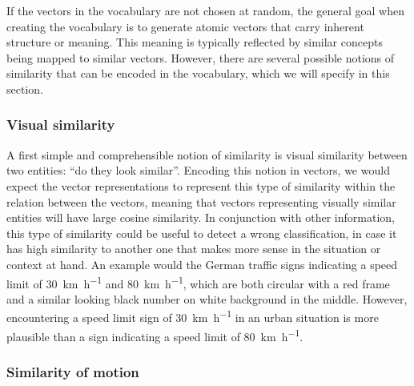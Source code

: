If the vectors in the vocabulary are not chosen at random, the general goal when creating the vocabulary is to generate atomic vectors that carry inherent structure or meaning.
This meaning is typically reflected by similar concepts being mapped to similar vectors.
However, there are several possible notions of similarity that can be encoded in the vocabulary, which we will specify in this section.

\subsubsection{Visual similarity}%
\label{ssubsec:visual_similarity}

A first simple and comprehensible notion of similarity is visual similarity between two entities: \enquote{do they look similar}. 
Encoding this notion in vectors, we would expect the vector representations to represent this type of similarity within the relation between the vectors, meaning that vectors representing visually similar entities will have large cosine similarity.
In conjunction with other information, this type of similarity could be useful to detect a wrong classification, in case it has high similarity to another one that makes more sense in the situation or context at hand.
An example would the German traffic signs indicating a speed limit of \SI[per-mode=symbol]{30}{\kilo\meter\per\hour} and \SI[per-mode=symbol]{80}{\kilo\meter\per\hour}, which are both circular with a red frame and a similar looking black number on white background in the middle.
However, encountering a speed limit sign of \SI[per-mode=symbol]{30}{\kilo\meter\per\hour} in an urban situation is more plausible than a sign indicating a speed limit of \SI[per-mode=symbol]{80}{\kilo\meter\per\hour}.

\subsubsection{Similarity of motion}%
\label{ssubsec:similarity_of_motion}

